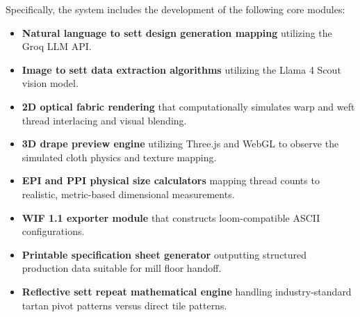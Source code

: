 Specifically, the system includes the development of the following core modules:
\begin{itemize}
    \item \textbf{Natural language to sett design generation mapping} utilizing the Groq LLM API.
    \item \textbf{Image to sett data extraction algorithms} utilizing the Llama 4 Scout vision model.
    \item \textbf{2D optical fabric rendering} that computationally simulates warp and weft thread interlacing and visual blending.
    \item \textbf{3D drape preview engine} utilizing Three.js and WebGL to observe the simulated cloth physics and texture mapping.
    \item \textbf{EPI and PPI physical size calculators} mapping thread counts to realistic, metric-based dimensional measurements.
    \item \textbf{WIF 1.1 exporter module} that constructs loom-compatible ASCII configurations.
    \item \textbf{Printable specification sheet generator} outputting structured production data suitable for mill floor handoff.
    \item \textbf{Reflective sett repeat mathematical engine} handling industry-standard tartan pivot patterns versus direct tile patterns.
\end{itemize}

